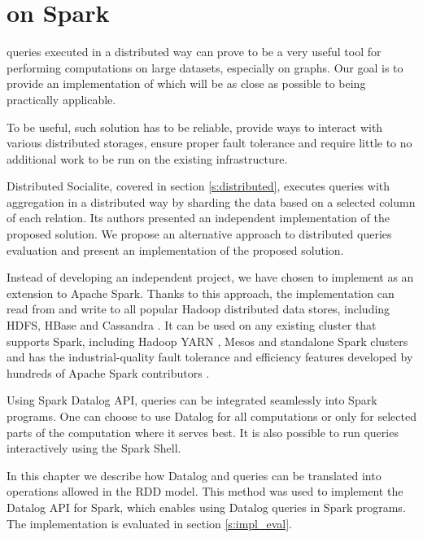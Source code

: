 

\chapter{\datalogra on Spark}\label{r:implementation}

\datalogra queries executed in a distributed way can prove to be a very useful tool for performing computations on large datasets, especially on graphs. Our goal is to provide an implementation of \datalogra which will be as close as possible to being practically applicable.

To be useful, such solution has to be reliable, provide ways to interact with various distributed storages, ensure proper fault tolerance and require little to no additional work to be run on the existing infrastructure.

Distributed Socialite, covered in section \ref{s:distributed}, executes queries with aggregation in a distributed way by sharding the data based on a selected column of each relation. Its authors presented an independent implementation of the proposed solution. We propose an alternative approach to distributed \datalogra queries evaluation and present an implementation of the proposed solution.

Instead of developing an independent project, we have chosen to implement \datalogra as an extension to Apache Spark. Thanks to this approach, the implementation can read from and write to all popular Hadoop distributed data stores, including HDFS, HBase and Cassandra \cite{sparkwww}. It can be used on any existing cluster that supports Spark, including Hadoop YARN \cite{hadoop}, Mesos and standalone Spark clusters \cite{sparkwww} and has the industrial-quality fault tolerance and efficiency features developed by hundreds of Apache Spark contributors \cite{githubspark}. 

Using Spark Datalog API, \datalogra queries can be integrated seamlessly into Spark programs. One can choose to use Datalog for all computations or only for selected parts of the computation where it serves best. It is also possible to run \datalogra queries interactively using the Spark Shell.

In this chapter we describe how Datalog and \datalogra queries can be translated into operations allowed in the RDD model. This method was used to implement the  Datalog API for Spark, which enables using Datalog queries in Spark programs. The implementation is evaluated in section \ref{s:impl_eval}.

